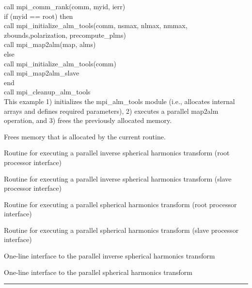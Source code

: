 \begin{example}
{
call mpi\_comm\_rank(comm, myid, ierr)\\
if (myid == root) then\\
\hspace*{1cm}call mpi\_initialize\_alm\_tools(comm, nsmax, nlmax, nmmax, \\
\hspace*{3cm}zbounds,polarization, precompute\_plms)\\
\hspace*{1cm}call mpi\_map2alm(map, alms)\\
else \\
\hspace*{1cm}call mpi\_initialize\_alm\_tools(comm)\\
\hspace*{1cm}call mpi\_map2alm\_slave\\
end\\
call mpi\_cleanup\_alm\_tools\\
}
{
This example 1) initializes the mpi\_alm\_tools module (i.e.,
allocates internal arrays and defines required parameters), 2)
executes a parallel map2alm operation, and 3) frees the previously
allocated memory.
}
\end{example}

\begin{related}
  \begin{sulist}{} %
   \item[\htmlref{mpi\_cleanup\_alm\_tools}{sub:mpi_cleanup_alm_tools}] Frees memory that is allocated by the current routine. 
  \item[\htmlref{mpi\_alm2map}{sub:mpi_alm2map}] Routine for executing a parallel inverse spherical harmonics transform (root processor interface)
  \item[\htmlref{mpi\_alm2map\_slave}{sub:mpi_alm2map_slave}] Routine for executing a parallel inverse spherical harmonics transform (slave processor interface)
  \item[\htmlref{mpi\_map2alm}{sub:mpi_map2alm}] Routine for executing a parallel spherical harmonics transform (root processor interface)
  \item[\htmlref{mpi\_map2alm\_slave}{sub:mpi_map2alm_slave}] Routine for executing a parallel spherical harmonics transform (slave processor interface)
  \item[\htmlref{mpi\_alm2map\_simple}{sub:mpi_alm2map_simple}] One-line interface to the parallel inverse spherical harmonics transform 
  \item[\htmlref{mpi\_map2alm\_simple}{sub:mpi_map2alm_simple}] One-line interface to the parallel spherical harmonics transform 
  \end{sulist}
\end{related}

\rule{\hsize}{2mm}

\newpage
